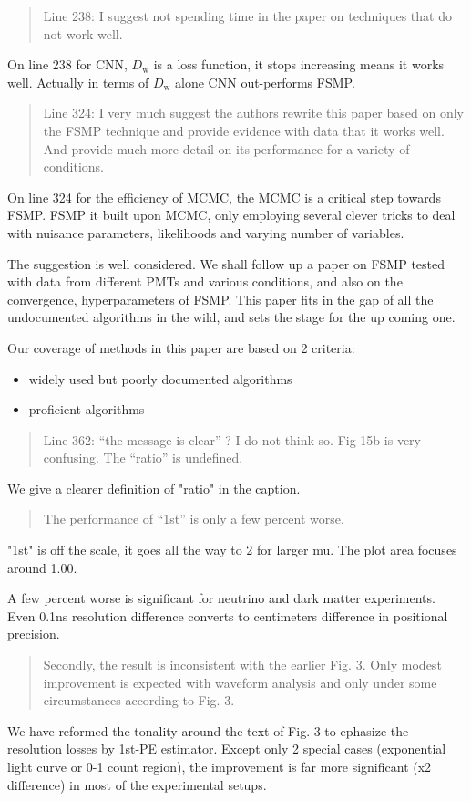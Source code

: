 \documentclass[12pt]{article}
\begin{document}
\begin{quote}
Line 238: I suggest not spending time in the paper on techniques that do not work well.
\end{quote}

On line 238 for CNN, $D_\mathrm{w}$ is a loss function, it stops increasing means it works well.  Actually in terms of $D_\mathrm{w}$ alone CNN out-performs FSMP.

\begin{quote}
Line 324: I very much suggest the authors rewrite this paper based on only the FSMP technique and provide evidence with data that it works well. And provide much more detail on its performance for a variety of conditions.
\end{quote}

On line 324 for the efficiency of MCMC, the MCMC is a critical step towards FSMP.  FSMP it built upon MCMC, only employing several clever tricks to deal with nuisance parameters, likelihoods and varying number
of variables.

The suggestion is well considered.  We shall follow up a paper on FSMP tested with data from different PMTs and various conditions, and also on the convergence, hyperparameters of FSMP.  This paper fits in the gap of all the undocumented algorithms in the wild, and sets the stage for the up coming one.

Our coverage of methods in this paper are based on 2 criteria:

\begin{itemize}
    \item widely used but poorly documented algorithms
    \item proficient algorithms
\end{itemize}

\begin{quote}
Line 362: ``the message is clear'' ? I do not think so. Fig 15b is very confusing. The ``ratio'' is undefined. 
\end{quote}

We give a clearer definition of "ratio" in the caption.

\begin{quote}
The performance of ``1st'' is only a few percent worse. 
\end{quote}

"1st" is off the scale, it goes all the way to 2 for larger mu.  The plot area focuses around 1.00.

A few percent worse is significant for neutrino and dark matter experiments.  Even 0.1ns resolution difference converts to centimeters difference in positional precision.

\begin{quote}
Secondly, the result is inconsistent with the earlier Fig. 3. Only modest improvement is expected with waveform analysis and only under some circumstances according to Fig. 3.
\end{quote}

We have reformed the tonality around the text of Fig. 3 to ephasize the resolution losses by 1st-PE estimator.  Except only 2 special cases (exponential light curve or 0-1 count region), the improvement is far more significant (x2 difference) in most of the experimental setups.
\end{document}
